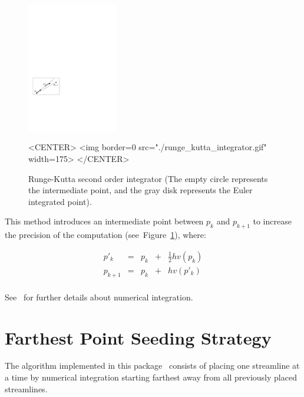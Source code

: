 \begin{figure}[h!]
\begin{ccTexOnly}
\begin{center}
\includegraphics[width=4cm]{Stream_lines_2/runge_kutta_integrator}
\end{center}
\end{ccTexOnly}
\begin{ccHtmlOnly}
<CENTER>
<img border=0 src="./runge_kutta_integrator.gif" width=175>
</CENTER>
\end{ccHtmlOnly}
\begin{center}
\caption{Runge-Kutta second order integrator (The empty circle represents the intermediate point, and the gray disk represents the Euler integrated point).
\label{runge_kutta_fig}}
\end{center}
\end{figure}

This method introduces an intermediate point  between $p_k$ and $p_{k+1}$ to increase the
precision of the computation (see~Figure~\ref{runge_kutta_fig}), where:

$$
\begin{array}{ccccc}
    p'_k    & = & p_k & + & \frac{1}{2}hv(p_k) \\
    p_{k+1} & = & p_k & + & hv(p'_k)        \\
   \end{array}
$$

See~\cite{cgal:ptvf-nrcpp-02} for further details about numerical
integration.

\section{Farthest Point Seeding Strategy\label{Section_2D_Streamlines_Strategy}}

The algorithm implemented in this package~\cite{cgal:mad-fpsep-05}
consists of placing one streamline at a time by numerical integration
starting farthest away from all previously placed
streamlines.\\

